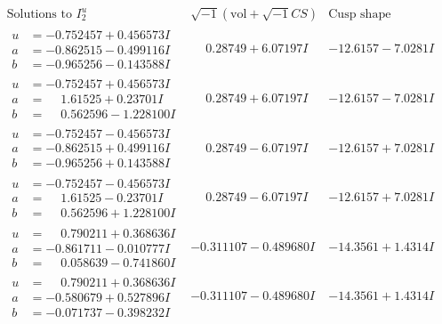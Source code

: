 \documentclass[1p]{elsarticle_modified}
\theoremstyle{definition}
\newcommand{\I}{\sqrt{-1}}
\begin{document}
$$\begin{array}{c|c|c}  
\text{Solutions to }I^u_{2}& \I (\text{vol} + \sqrt{-1}CS) & \text{Cusp shape}\\
 \hline 
\begin{aligned}
u &= -0.752457 + 0.456573 I \\
a &= -0.862515 - 0.499116 I \\
b &= -0.965256 - 0.143588 I\end{aligned}
 & \phantom{-}0.28749 + 6.07197 I & -12.6157 - 7.0281 I \\ \hline\begin{aligned}
u &= -0.752457 + 0.456573 I \\
a &= \phantom{-}1.61525 + 0.23701 I \\
b &= \phantom{-}0.562596 - 1.228100 I\end{aligned}
 & \phantom{-}0.28749 + 6.07197 I & -12.6157 - 7.0281 I \\ \hline\begin{aligned}
u &= -0.752457 - 0.456573 I \\
a &= -0.862515 + 0.499116 I \\
b &= -0.965256 + 0.143588 I\end{aligned}
 & \phantom{-}0.28749 - 6.07197 I & -12.6157 + 7.0281 I \\ \hline\begin{aligned}
u &= -0.752457 - 0.456573 I \\
a &= \phantom{-}1.61525 - 0.23701 I \\
b &= \phantom{-}0.562596 + 1.228100 I\end{aligned}
 & \phantom{-}0.28749 - 6.07197 I & -12.6157 + 7.0281 I \\ \hline\begin{aligned}
u &= \phantom{-}0.790211 + 0.368636 I \\
a &= -0.861711 - 0.010777 I \\
b &= \phantom{-}0.058639 - 0.741860 I\end{aligned}
 & -0.311107 - 0.489680 I & -14.3561 + 1.4314 I \\ \hline\begin{aligned}
u &= \phantom{-}0.790211 + 0.368636 I \\
a &= -0.580679 + 0.527896 I \\
b &= -0.071737 - 0.398232 I\end{aligned}
 & -0.311107 - 0.489680 I & -14.3561 + 1.4314 I \\ \hline\begin{aligned}

\end{aligned}
\end{array}$$
\end{document}
